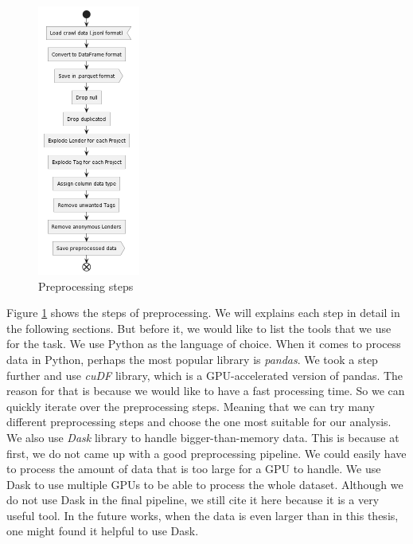 \begin{figure}[H]
	\centering
	\includegraphics[width=0.3\textwidth]{images/graphuml/preprocessing.png}
	\caption{Preprocessing steps}
	\label{fig:preprocessing}
\end{figure}

Figure \ref{fig:preprocessing} shows the steps of preprocessing.
We will explains each step in detail in the following sections.
But before it, we would like to list the tools that we use for the task.
We use Python as the language of choice.
When it comes to process data in Python, perhaps the most popular library is \textit{pandas}\parencite{pandas}.
We took a step further and use \textit{cuDF}\parencite{cudf} library, which is a GPU-accelerated version of pandas.
The reason for that is because we would like to have a fast processing time.
So we can quickly iterate over the preprocessing steps.
Meaning that we can try many different preprocessing steps and choose the one most suitable for our analysis.
We also use \textit{Dask}\parencite{dask} library to handle bigger-than-memory data.
This is because at first, we do not came up with a good preprocessing pipeline.
We could easily have to process the amount of data that is too large for a GPU to handle.
We use Dask to use multiple GPUs to be able to process the whole dataset.
Although we do not use Dask in the final pipeline, we still cite it here because it is a very useful tool.
In the future works, when the data is even larger than in this thesis, one might found it helpful to use Dask.

